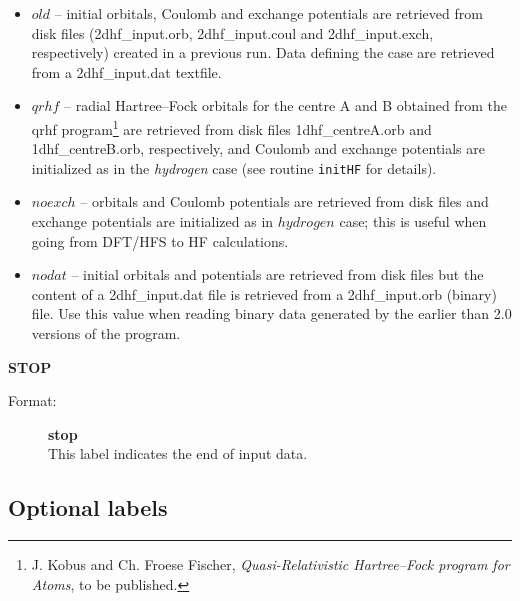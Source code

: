 \documentclass[12pt,a4paper]{article}
\newcommand{\ft}[1]{\texttt{#1}}
\begin{document}
\begin{description}
\begin{description}
\begin{itemize}
\item $old$ -- initial orbitals, Coulomb and exchange potentials are retrieved from disk
  files (2dhf\_\-input.\-orb, 2dhf\_\-input.\-coul and 2dhf\_input.exch, respectively) created in
  a previous run. Data defining the case are retrieved from a 2dhf\_input.\-dat textfile.

\item $qrhf$ -- radial Hartree--Fock orbitals for the centre A and B
  obtained from the qrhf program\footnote{J. Kobus and Ch. Froese
    Fischer, \textsl{Quasi-Relativistic Hartree--Fock program for
      Atoms}, to be published.}  are retrieved from disk files
  1dhf\-\_centreA.\-orb and 1dhf\-\_centreB.\-orb, respectively, and
  Coulomb and exchange potentials are initialized as in the
  \textsl{hydrogen} case (see routine \ft{initHF} for details).

\item $noexch$ -- orbitals and Coulomb potentials are retrieved from disk files and
  exchange potentials are initialized as in $hydrogen$ case; this is useful when going
  from DFT/HFS to HF calculations.

\item $nodat$ -- initial orbitals and potentials are retrieved from disk files but the
  content of a 2dhf\_input.dat file is retrieved from a 2dhf\_input.orb (binary) file. Use
  this value when reading binary data generated by the earlier than 2.0 versions of the
  program.

\end{itemize}
\end{description}



\item \textbf{STOP}
\begin{description}
\item[Format:] \textbf{stop}\\
This label indicates the end of input data.
\end{description}

\end{description}


\subsection{Optional labels}
\end{document}
